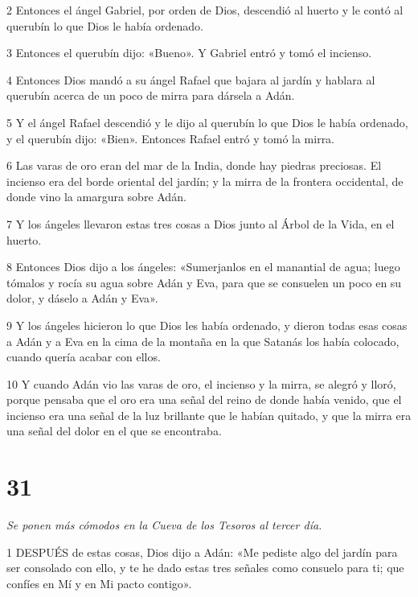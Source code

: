 \par 2 Entonces el ángel Gabriel, por orden de Dios, descendió al huerto y le contó al querubín lo que Dios le había ordenado.

\par 3 Entonces el querubín dijo: «Bueno». Y Gabriel entró y tomó el incienso.

\par 4 Entonces Dios mandó a su ángel Rafael que bajara al jardín y hablara al querubín acerca de un poco de mirra para dársela a Adán.

\par 5 Y el ángel Rafael descendió y le dijo al querubín lo que Dios le había ordenado, y el querubín dijo: «Bien». Entonces Rafael entró y tomó la mirra.

\par 6 Las varas de oro eran del mar de la India, donde hay piedras preciosas. El incienso era del borde oriental del jardín; y la mirra de la frontera occidental, de donde vino la amargura sobre Adán.

\par 7 Y los ángeles llevaron estas tres cosas a Dios junto al Árbol de la Vida, en el huerto.

\par 8 Entonces Dios dijo a los ángeles: «Sumerjanlos en el manantial de agua; luego tómalos y rocía su agua sobre Adán y Eva, para que se consuelen un poco en su dolor, y dáselo a Adán y Eva».

\par 9 Y los ángeles hicieron lo que Dios les había ordenado, y dieron todas esas cosas a Adán y a Eva en la cima de la montaña en la que Satanás los había colocado, cuando quería acabar con ellos.

\par 10 Y cuando Adán vio las varas de oro, el incienso y la mirra, se alegró y lloró, porque pensaba que el oro era una señal del reino de donde había venido, que el incienso era una señal de la luz brillante que le habían quitado, y que la mirra era una señal del dolor en el que se encontraba.

\chapter{31}

\par \textit{Se ponen más cómodos en la Cueva de los Tesoros al tercer día.}

\par 1 DESPUÉS de estas cosas, Dios dijo a Adán: «Me pediste algo del jardín para ser consolado con ello, y te he dado estas tres señales como consuelo para ti; que confíes en Mí y en Mi pacto contigo».

